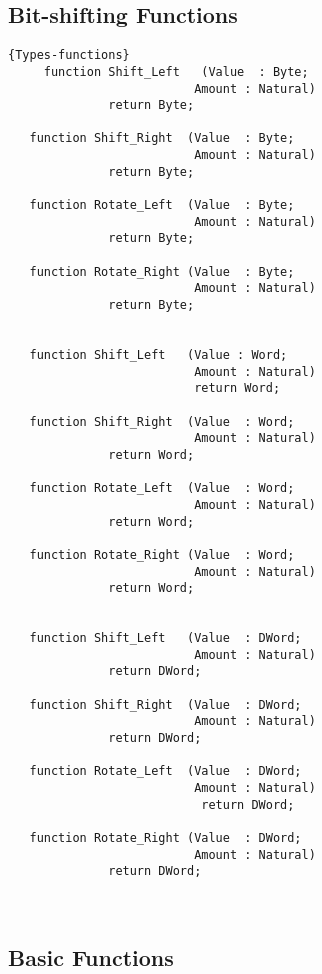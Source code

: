 \subsection{Bit-shifting Functions}
\begin{lstlisting}{Types-functions}
     function Shift_Left   (Value  : Byte;
                          Amount : Natural) 
			  return Byte;

   function Shift_Right  (Value  : Byte;
                          Amount : Natural) 
			  return Byte;

   function Rotate_Left  (Value  : Byte;
                          Amount : Natural)
			  return Byte;

   function Rotate_Right (Value  : Byte;
                          Amount : Natural)
			  return Byte;


   function Shift_Left   (Value : Word;
                          Amount : Natural) 
                          return Word;

   function Shift_Right  (Value  : Word; 
                          Amount : Natural) 
			  return Word;

   function Rotate_Left  (Value  : Word; 
                          Amount : Natural) 
			  return Word;

   function Rotate_Right (Value  : Word; 
                          Amount : Natural) 
			  return Word;


   function Shift_Left   (Value  : DWord; 
                          Amount : Natural) 
			  return DWord;

   function Shift_Right  (Value  : DWord;
                          Amount : Natural)
			  return DWord;

   function Rotate_Left  (Value  : DWord; 
                          Amount : Natural)
                           return DWord;

   function Rotate_Right (Value  : DWord;
                          Amount : Natural) 
			  return DWord;
\end{lstlisting}\ \\


\subsection{Basic Functions}\ 

